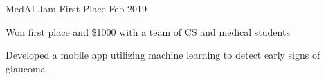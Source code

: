 
\begin{cventries}
  \cventry
    {MedAI Jam} %
    {First Place} %
    {} %
    {Feb 2019} %
    {
      \begin{cvitems}
        \item {Won first place and \$1000 with a team of CS and medical students}
        \item {Developed a mobile app utilizing machine learning to detect early signs of glaucoma}
      \end{cvitems}
    } %

\end{cventries}